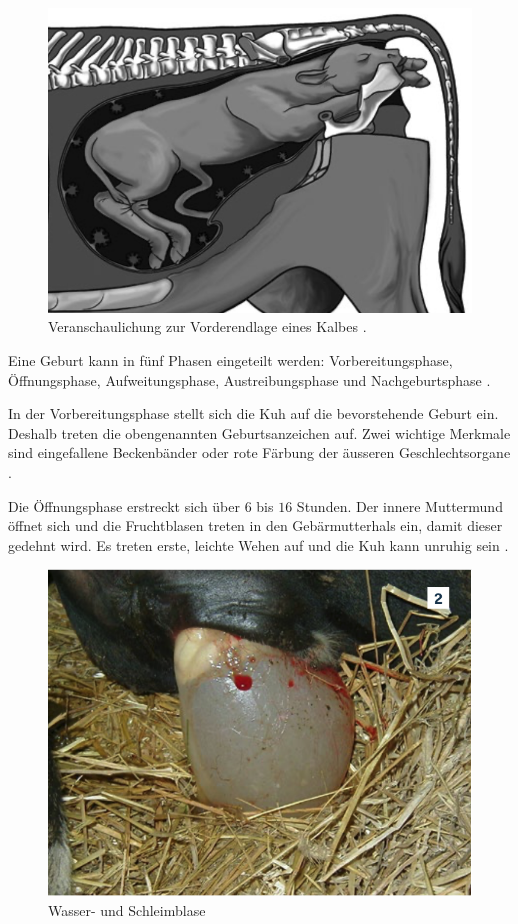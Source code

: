 \begin{figure}[H]
	\center
	\includegraphics[scale=.45]{Grafiken/vorderendlage.png}
	\caption{Veranschaulichung zur Vorderendlage eines Kalbes \citep[S. 17]{Traulsen2013}.}
	\label{fig: Schwanzhebung}
\end{figure}

Eine Geburt kann in fünf Phasen eingeteilt werden: Vorbereitungsphase, Öffnungsphase, Aufweitungsphase, Austreibungsphase und Nachgeburtsphase \citep[S. 6-8 ]{Traulsen2013}.

In der Vorbereitungsphase stellt sich die Kuh auf die bevorstehende Geburt ein. Deshalb treten die obengenannten Geburtsanzeichen auf. Zwei wichtige Merkmale sind eingefallene Beckenbänder oder rote Färbung der äusseren Geschlechtsorgane \citep[S. 6 ]{Traulsen2013}.  

Die Öffnungsphase erstreckt sich über $6$ bis $16$ Stunden. Der innere Muttermund öffnet sich und die Fruchtblasen treten in den Gebärmutterhals ein, damit dieser gedehnt wird. Es treten erste, leichte Wehen auf und die Kuh kann unruhig sein \citep[S. 7 ]{Traulsen2013}.  

\begin{figure}[H]
	\center
	\includegraphics[scale=.45]{Grafiken/oeffnungsphase.png}
	\caption{Wasser- und Schleimblase}
	\label{fig: Öffnungsphase}
\end{figure}


